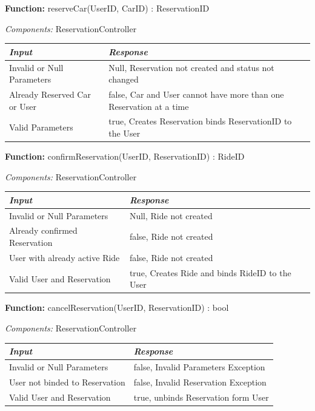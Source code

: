 \documentclass[a4paper]{article}
\begin{document}
\textbf{Function:} reserveCar(UserID, CarID) : ReservationID \par
\textit{Components:} ReservationController
\begin{center}
\begin{tabular}{ | L{6cm} | L{6cm} | }
\hline
	\textit{Input}& \textit{Response}\\ \hline
	Invalid or Null Parameters & Null, Reservation not created and status not changed\\ \hline
	Already Reserved Car or User & false, Car and User cannot have more than one Reservation at a time\\ \hline
	Valid Parameters & true, Creates Reservation binds ReservationID to the User \\ \hline
\end{tabular}
\end{center}
\textbf{Function:} confirmReservation(UserID, ReservationID) : RideID \par
\textit{Components:} ReservationController
\begin{center}
\begin{tabular}{ | L{6cm} | L{6cm} | }
\hline
	\textit{Input}& \textit{Response}\\ \hline
	Invalid or Null Parameters & Null, Ride not created\\ \hline
	Already confirmed Reservation & false, Ride not created\\ \hline
	User with already active Ride & false, Ride not created\\ \hline
	Valid User and Reservation& true, Creates Ride and binds RideID to the User \\ \hline
\end{tabular}
\end{center}
\textbf{Function:} cancelReservation(UserID, ReservationID) : bool \par
\textit{Components:} ReservationController
\begin{center}
\begin{tabular}{ | L{6cm} | L{6cm} | }
\hline
	\textit{Input}& \textit{Response}\\ \hline
	Invalid or Null Parameters & false, Invalid Parameters Exception\\ \hline
	User not binded to Reservation & false, Invalid Reservation Exception\\ \hline
	Valid User and Reservation& true, unbinds Reservation form User\\ \hline
\end{tabular}
\end{center}
\end{document}
